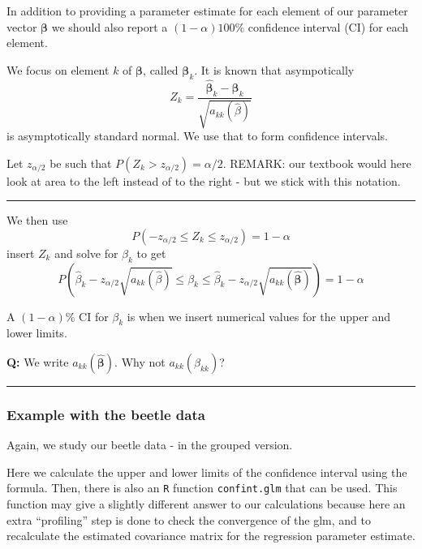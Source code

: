 \documentclass[
]{article}
\begin{document}
In addition to providing a parameter estimate for each element of our
parameter vector \(\boldsymbol{\beta}\) we should also report a
\((1-\alpha)100\)\% confidence interval (CI) for each element.

We focus on element \(k\) of \(\boldsymbol{\beta}\), called
\(\boldsymbol{\beta}_k\). It is known that asympotically
\[ Z_k=\frac{\hat{\boldsymbol{\beta}}_k-\boldsymbol{\beta}_k}{\sqrt{{a}_{kk}(\hat{\beta})}}\]
is asymptotically standard normal. We use that to form confidence
intervals.

Let \(z_{\alpha/2}\) be such that \(P(Z_k>z_{\alpha/2})=\alpha/2\).
REMARK: our textbook would here look at area to the left instead of to
the right - but we stick with this notation.

\begin{center}\rule{0.5\linewidth}{0.5pt}\end{center}

We then use \[ P(-z_{\alpha/2}\le Z_k \le z_{\alpha/2})=1-\alpha\]
insert \(Z_k\) and solve for \(\beta_k\) to get
\[ P(\hat{\beta}_k-z_{\alpha/2}\sqrt{a_{kk}(\hat{\beta})}
\le \beta_k \le \hat{\beta}_k-z_{\alpha/2}\sqrt{a_{kk}(\hat{\boldsymbol{\beta}})})=1-\alpha\]

A \((1-\alpha)\)\% CI for \(\beta_k\) is when we insert numerical values
for the upper and lower limits.

\textbf{Q:} We write \(a_{kk}(\hat{\boldsymbol{\beta}})\). Why not
\(a_{kk}(\hat{\beta}_{kk})\)?

\begin{center}\rule{0.5\linewidth}{0.5pt}\end{center}

\hypertarget{example-with-the-beetle-data}{%
\subsubsection{Example with the beetle
data}\label{example-with-the-beetle-data}}

Again, we study our beetle data - in the grouped version.

Here we calculate the upper and lower limits of the confidence interval
using the formula. Then, there is also an \texttt{R} function
\texttt{confint.glm} that can be used. This function may give a slightly
different answer to our calculations because here an extra ``profiling''
step is done to check the convergence of the glm, and to recalculate the
estimated covariance matrix for the regression parameter estimate.
\end{document}
